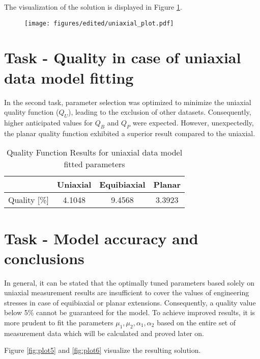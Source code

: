 \documentclass[12pt]{article}
\begin{document}
\noindent The visualization of the solution is displayed in Figure \ref{fig:plot1_01}.

\begin{figure}[ht!]
  \begin{center}
  \texttt{[image: figures/edited/uniaxial\_plot.pdf]}
  \label{fig:plot1_01}
  \end{center}
\end{figure}

\newpage
\section{Task - Quality in case of uniaxial data model fitting}
In the second task, parameter selection was optimized to minimize the uniaxial quality function ($Q_U$), leading to the exclusion of other datasets. Consequently, higher anticipated values for $Q_B$ and $Q_P$ were expected. However, unexpectedly, the planar quality function exhibited a superior result compared to the uniaxial.

\begin{table}[htbp]
  \centering
  \caption{Quality Function Results for uniaxial data model fitted parameters}
  \label{tab:quality_results}
  \begin{tabular}{cccc}
      & \textbf{Uniaxial} & \textbf{Equibiaxial} & \textbf{Planar}\\[0.2 cm] \hline
      Quality [\%] & 4.1048 & 9.4568 & 3.3923 
  \end{tabular}
\end{table}


\section{Task - Model accuracy and conclusions}
In general, it can be stated that the optimally tuned parameters based solely on uniaxial measurement results are insufficient to cover the values of engineering stresses in case of equibiaxial or planar extensions. Consequently, a quality value below 5\% cannot be guaranteed for the model. To achieve improved results, it is more prudent to fit the parameters $\mu_1, \mu_2, \alpha_1, \alpha_2$ based on the entire set of measurement data which will be calculated and proved later on. 
\medskip

\noindent Figure \ref{fig:plot5} and \ref{fig:plot6} visualize the resulting solution. 
\end{document}
